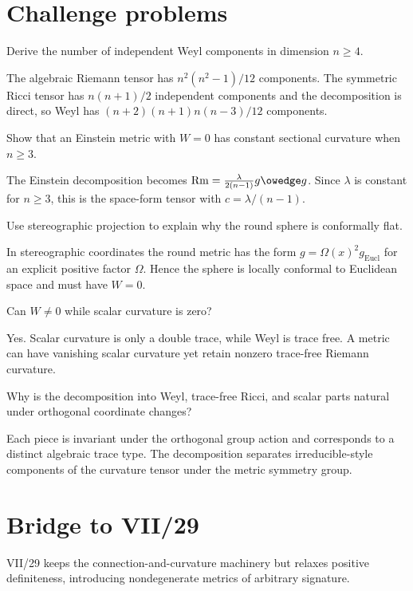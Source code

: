 \section{Challenge problems}
\begin{problem}\label{prob:vii28-ch01}
Derive the number of independent Weyl components in dimension \(n\ge4\).
\end{problem}
\begin{solution}
The algebraic Riemann tensor has \(n^2(n^2-1)/12\) components. The symmetric Ricci tensor has \(n(n+1)/2\) independent components and the decomposition is direct, so Weyl has \((n+2)(n+1)n(n-3)/12\) components.
\end{solution}

\begin{problem}\label{prob:vii28-ch02}
Show that an Einstein metric with \(W=0\) has constant sectional curvature when \(n\ge3\).
\end{problem}
\begin{solution}
The Einstein decomposition becomes \(\operatorname{Rm}=\frac{\lambda}{2(n-1)}g\owedge g\). Since \(\lambda\) is constant for \(n\ge3\), this is the space-form tensor with \(c=\lambda/(n-1)\).
\end{solution}

\begin{problem}\label{prob:vii28-ch03}
Use stereographic projection to explain why the round sphere is conformally flat.
\end{problem}
\begin{solution}
In stereographic coordinates the round metric has the form \(g=\Omega(x)^2g_{\mathrm{Eucl}}\) for an explicit positive factor \(\Omega\). Hence the sphere is locally conformal to Euclidean space and must have \(W=0\).
\end{solution}

\begin{problem}\label{prob:vii28-ch04}
Can \(W\neq0\) while scalar curvature is zero?
\end{problem}
\begin{solution}
Yes. Scalar curvature is only a double trace, while Weyl is trace free. A metric can have vanishing scalar curvature yet retain nonzero trace-free Riemann curvature.
\end{solution}

\begin{problem}\label{prob:vii28-ch05}
Why is the decomposition into Weyl, trace-free Ricci, and scalar parts natural under orthogonal coordinate changes?
\end{problem}
\begin{solution}
Each piece is invariant under the orthogonal group action and corresponds to a distinct algebraic trace type. The decomposition separates irreducible-style components of the curvature tensor under the metric symmetry group.
\end{solution}

\section*{Bridge to VII/29}
VII/29 keeps the connection-and-curvature machinery but relaxes positive definiteness, introducing nondegenerate metrics of arbitrary signature.
